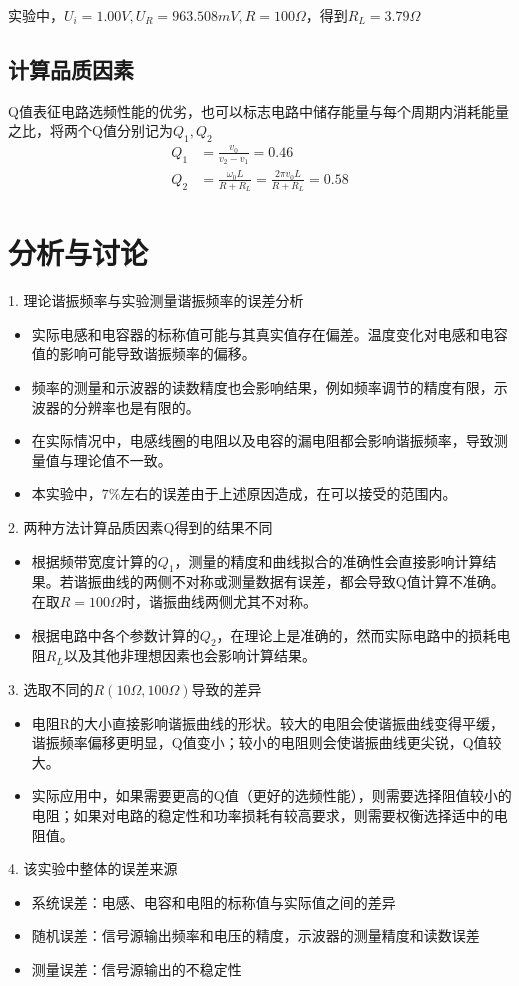 \documentclass{article}
\begin{document}
实验中，$U_i = 1.00V, U_R = 963.508 mV, R = 100\Omega$，得到$R_L = 3.79 \Omega$

\subsection{计算品质因素}
Q值表征电路选频性能的优劣，也可以标志电路中储存能量与每个周期内消耗能量之比，将两个Q值分别记为$Q_1, Q_2$
\begin{align*}
    Q_1 &= \frac{v_0}{v_2 - v_1} = 0.46 \\
    Q_2 &= \frac{\omega_0 L}{R + R_L} = \frac{2\pi v_0 L}{R + R_L} = 0.58
\end{align*}

\section{分析与讨论}
1. 理论谐振频率与实验测量谐振频率的误差分析
\begin{itemize}
    \item 实际电感和电容器的标称值可能与其真实值存在偏差。温度变化对电感和电容值的影响可能导致谐振频率的偏移。
    \item 频率的测量和示波器的读数精度也会影响结果，例如频率调节的精度有限，示波器的分辨率也是有限的。
    \item 在实际情况中，电感线圈的电阻以及电容的漏电阻都会影响谐振频率，导致测量值与理论值不一致。
    \item 本实验中，$7\%$左右的误差由于上述原因造成，在可以接受的范围内。
\end{itemize}

2. 两种方法计算品质因素Q得到的结果不同
\begin{itemize}
    \item 根据频带宽度计算的$Q_1$，测量的精度和曲线拟合的准确性会直接影响计算结果。若谐振曲线的两侧不对称或测量数据有误差，都会导致Q值计算不准确。在取$R=100\Omega$时，谐振曲线两侧尤其不对称。
    \item 根据电路中各个参数计算的$Q_2$，在理论上是准确的，然而实际电路中的损耗电阻$R_L$以及其他非理想因素也会影响计算结果。
\end{itemize}

3. 选取不同的$R (10\Omega, 100\Omega)$导致的差异
\begin{itemize}
    \item 电阻R的大小直接影响谐振曲线的形状。较大的电阻会使谐振曲线变得平缓，谐振频率偏移更明显，Q值变小；较小的电阻则会使谐振曲线更尖锐，Q值较大。
    \item 实际应用中，如果需要更高的Q值（更好的选频性能），则需要选择阻值较小的电阻；如果对电路的稳定性和功率损耗有较高要求，则需要权衡选择适中的电阻值。
\end{itemize}

4. 该实验中整体的误差来源
\begin{itemize}
    \item 系统误差：电感、电容和电阻的标称值与实际值之间的差异
    \item 随机误差：信号源输出频率和电压的精度，示波器的测量精度和读数误差
    \item 测量误差：信号源输出的不稳定性
\end{itemize}
\end{document}

